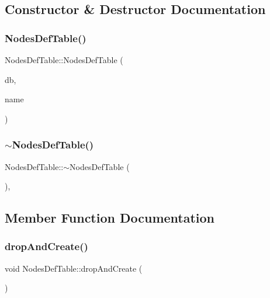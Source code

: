 \subsection{Constructor \& Destructor Documentation}
\mbox{\label{class_nodes_def_table_a039282d7516ffa4a5f9f2843c8eca2bf}} 
\subsubsection{\texorpdfstring{NodesDefTable()}{NodesDefTable()}}
{\footnotesize\ttfamily Nodes\+Def\+Table\+::\+Nodes\+Def\+Table (\begin{DoxyParamCaption}\item[{std\+::shared\+\_\+ptr$<$ sqlite\+::\+S\+Q\+Lite\+Storage $>$}]{db,  }\item[{std\+::string}]{name }\end{DoxyParamCaption})}

\mbox{\label{class_nodes_def_table_a7245156e06fc5a05da08ad6e73011ad1}} 
\subsubsection{\texorpdfstring{$\sim$NodesDefTable()}{~NodesDefTable()}}
{\footnotesize\ttfamily Nodes\+Def\+Table\+::$\sim$\+Nodes\+Def\+Table (\begin{DoxyParamCaption}{ }\end{DoxyParamCaption})\hspace{0.3cm}{\ttfamily [default]}, {\ttfamily [noexcept]}}



\subsection{Member Function Documentation}
\mbox{\label{class_nodes_def_table_a48e50902bff4f9c52ff01e0048d2ae6b}} 
\subsubsection{\texorpdfstring{dropAndCreate()}{dropAndCreate()}}
{\footnotesize\ttfamily void Nodes\+Def\+Table\+::drop\+And\+Create (\begin{DoxyParamCaption}{ }\end{DoxyParamCaption})}

